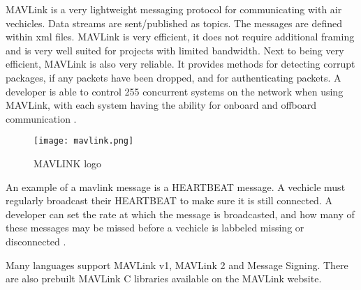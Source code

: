 
MAVLink is a very lightweight messaging protocol for communicating with air vechicles. Data streams are sent/published as topics.  
The messages are defined within \acs{xml} files. MAVLink is very efficient, it does not require additional framing and is very well 
suited for projects with limited bandwidth. Next to being very efficient, MAVLink is also very reliable. It provides methods for 
detecting corrupt packages, if any packets have been dropped, and for authenticating packets. A developer is able to control 255 concurrent 
systems on the network when using MAVLink, with each system having the ability for onboard and offboard communication \cite{mavlink:about}.

\begin{figure}[ht]
    \centering
    \texttt{[image: mavlink.png]}
    \caption[MAVLINK logo]{MAVLINK logo}
\end{figure}

An example of a mavlink message is a HEARTBEAT message. A vechicle must regularly broadcast their HEARTBEAT to make sure it is still connected. 
A developer can set the rate at which the message is broadcasted, and how many of these messages may be missed before a vechicle is labbeled missing 
or disconnected \cite{mavlink:heartbeat}.

Many languages support MAVLink v1, MAVLink 2 and Message Signing. There are also prebuilt MAVLink C libraries available on the MAVLink website.

